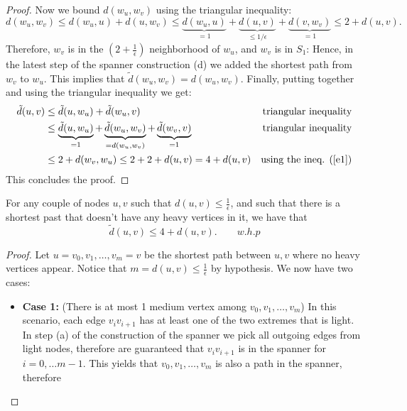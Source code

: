 \documentclass[11pt]{article}
\begin{document}
\begin{enumerate}
\begin{proof}
        Now we bound $d(w_u,w_v)$ using the triangular inequality:
        \begin{equation}\label{e1}
            d(w_u,w_v) \leq d(w_u,u)+d(u,w_v)\leq \underbrace{d(w_u,u)}_{=1}+\underbrace{d(u,v)}_{\leq 1/\epsilon}+\underbrace{d(v,w_v)}_{=1} \leq 2 + d(u,v).
        \end{equation}
        Therefore, $w_v$ is in the $\left(2+\frac{1}{\epsilon}\right)$ neighborhood of $w_u$, and $w_v$ is in $S_1$: Hence, in the latest step of the spanner construction (d) we added the shortest path from $w_v$ to $w_u$. This implies that $\tilde d(w_u,w_v) = d(w_u,w_v)$. Finally, putting together and using the triangular inequality we get:
        \begin{align*}
            \tilde d(u,v) &\leq \tilde d(u,w_u) +\tilde d (w_u,v) & \text{triangular inequality}\\
            &\leq \underbrace{\tilde d(u,w_u)}_{=1} +\underbrace{\tilde d (w_u,w_v)}_{=d (w_u,w_v)} + \underbrace{\tilde d(w_v,v) }_{=1} & \text{triangular inequality}\\
            & \leq 2 + d(w_v,w_u) \leq 2+2+d(u,v) = 4+d(u,v) & \text{using the ineq. (\ref{e1})}
        \end{align*}
        This concludes the proof.
    \end{proof}
    \begin{lemma} For any couple of nodes $u,v$ such that $d(u,v) \leq \frac{1}{\epsilon}$, and such that there is a shortest past that doesn't have any heavy vertices in it, we have that
        \begin{equation*}
            \tilde d(u,v) \leq 4 + d(u,v).\qquad w.h.p
        \end{equation*}
    \end{lemma}
    \begin{proof}
        Let $u = v_0,v_1,\dots,v_m = v$ be the shortest path between $u, v$ where no heavy vertices appear. Notice that $m = d(u,v)\leq \frac{1}{\epsilon}$ by hypothesis. We now have two cases:
        \begin{itemize}
            \item \textbf{Case 1:} (There is at most 1 medium vertex among $v_0,v_1,\dots,v_m$) 
            In this scenario, each edge $v_iv_{i+1}$ has at least one of the two extremes that is light. In step (a) of the construction of the spanner we pick all outgoing edges from light nodes, therefore are guaranteed that $v_iv_{i+1}$ is in the spanner for $i = 0, \dots m-1$. This yields that $v_0,v_1,\dots,v_m$ is also a path in the spanner, therefore

\end{itemize}
\end{proof}
\end{enumerate}
\end{document}
